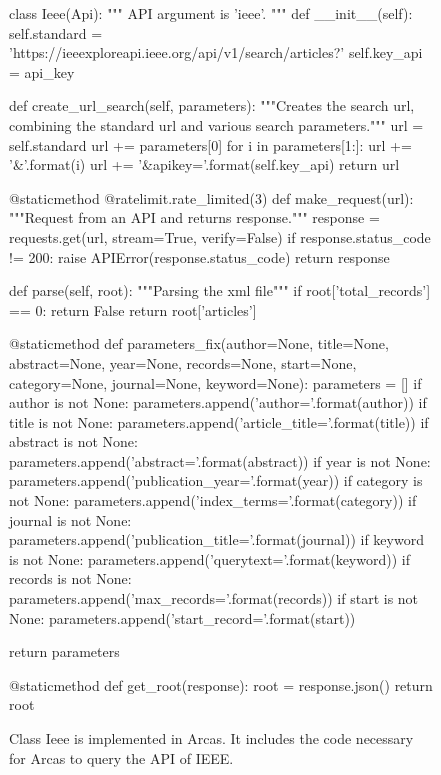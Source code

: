 \begin{figure}[!hbtp]
    \begin{sourcepy}
class Ieee(Api):
    """
        API argument is 'ieee'.
    """
    def __init__(self):
        self.standard = 'https://ieeexploreapi.ieee.org/api/v1/search/articles?'
        self.key_api = api_key

    def create_url_search(self, parameters):
        """Creates the search url, combining the standard url and various
        search parameters."""
        url = self.standard
        url += parameters[0]
        for i in parameters[1:]:
            url += '&{}'.format(i)
        url += '&apikey={}'.format(self.key_api)
        return url

    @staticmethod
    @ratelimit.rate_limited(3)
    def make_request(url):
        """Request from an API and returns response."""
        response = requests.get(url, stream=True, verify=False)
        if response.status_code != 200:
            raise APIError(response.status_code)
        return response

    def parse(self, root):
        """Parsing the xml file"""
        if root['total_records'] == 0:
            return False
        return root['articles']

    @staticmethod
    def parameters_fix(author=None, title=None, abstract=None, year=None,
                        records=None, start=None, category=None, journal=None,
                        keyword=None):
        parameters = []
        if author is not None:
            parameters.append('author={}'.format(author))
        if title is not None:
            parameters.append('article_title={}'.format(title))
        if abstract is not None:
            parameters.append('abstract={}'.format(abstract))
        if year is not None:
            parameters.append('publication_year={}'.format(year))
        if category is not None:
            parameters.append('index_terms={}'.format(category))
        if journal is not None:
            parameters.append('publication_title={}'.format(journal))
        if keyword is not None:
            parameters.append('querytext={}'.format(keyword))
        if records is not None:
            parameters.append('max_records={}'.format(records))
        if start is not None:
            parameters.append('start_record={}'.format(start))

        return parameters

    @staticmethod
    def get_root(response):
        root = response.json()
        return root
    
\end{sourcepy}
\caption{Class Ieee is implemented in Arcas. It includes the code necessary for Arcas
to query the API of IEEE.}\label{fig:arcas_ieee}
\end{figure}

